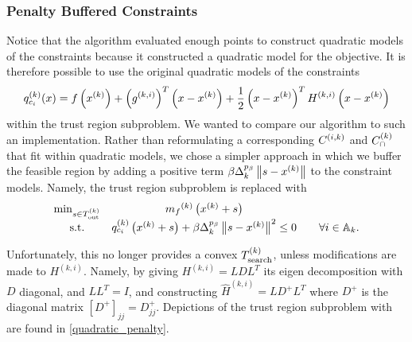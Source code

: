 
\subsubsection{Penalty Buffered Constraints}
\label{penalty_buffered_description}

Notice that the algorithm evaluated enough points to construct quadratic models of the constraints because it constructed a quadratic model for the objective.
It is therefore possible to use the original quadratic models of the constraints
\begin{align*}
q_{c_i}^{(k)}(x) = f\left(x^{(k)}\right) + \left(g^{(k, i)}\right)^T\left(x - x^{(k)}\right) + \frac 1 2 \left(x - x^{(k)}\right)^T H^{(k, i)}\left(x - x^{(k)}\right)
\end{align*}
within the trust region subproblem.
We wanted to compare our algorithm to such an implementation.
Rather than reformulating a corresponding ${C^{(i, k)}}$ and ${C^{(k)}_{\cap}}$ that fit within quadratic models,
we chose a simpler approach in which we buffer the feasible region by adding a positive term $\beta \Delta_k^{p_\beta}\left\|s - x^{(k)}\right\|$ to the constraint models.
Namely, the trust region subproblem is replaced with
\begin{align*}
\begin{array}{ccc}
\min_{s \in {T_{\text{out}}^{(k)}}} & {{m}_f}^{(k)}\left(x^{(k)} + s\right) & \\
\textrm{s.t.} & q_{c_i}^{(k)}\left(x^{(k)} + s\right) + \beta \Delta_k^{p_{\beta}}\left\|s - x^{(k)}\right\|^2 \le 0 &\quad \forall i \in {\mathbb A_{k}}.
\end{array}
\end{align*}

Unfortunately, this no longer provides a convex ${T_{\text{search}}^{(k)}}$, unless modifications are made to $H^{(k, i)}$.
Namely, by giving $H^{(k, i)} = L D L^T$ its eigen decomposition with $D$ diagonal, and $LL^T = I$, and 
constructing $\hat H^{(k, i)} = L D^+ L^T$ where $D^+$ is the diagonal matrix $[D^+]_{jj} = D_{jj}^+$.
Depictions of the trust region subproblem with are found in \cref{quadratic_penalty}.

